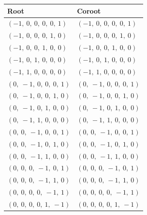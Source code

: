 \documentclass[11pt]{article}
\theoremstyle{definition}
\begin{document}
\begin{tabular}{|l|l|}
    \hline
    \textbf{Root} & \textbf{Coroot} \\
    \hline
    $\left( -1, \  0, \  0, \  0, \  0, \  1\right)$ & $\left( -1, \  0, \  0, \  0, \  0, \  1\right)$ \\
    \hline
    $\left( -1, \  0, \  0, \  0, \  1, \  0\right)$ & $\left( -1, \  0, \  0, \  0, \  1, \  0\right)$ \\
    \hline
    $\left( -1, \  0, \  0, \  1, \  0, \  0\right)$ & $\left( -1, \  0, \  0, \  1, \  0, \  0\right)$ \\
    \hline
    $\left( -1, \  0, \  1, \  0, \  0, \  0\right)$ & $\left( -1, \  0, \  1, \  0, \  0, \  0\right)$ \\
    \hline
    $\left( -1, \  1, \  0, \  0, \  0, \  0\right)$ & $\left( -1, \  1, \  0, \  0, \  0, \  0\right)$ \\
    \hline
    $\left( 0, \  -1, \  0, \  0, \  0, \  1\right)$ & $\left( 0, \  -1, \  0, \  0, \  0, \  1\right)$ \\
    \hline
    $\left( 0, \  -1, \  0, \  0, \  1, \  0\right)$ & $\left( 0, \  -1, \  0, \  0, \  1, \  0\right)$ \\
    \hline
    $\left( 0, \  -1, \  0, \  1, \  0, \  0\right)$ & $\left( 0, \  -1, \  0, \  1, \  0, \  0\right)$ \\
    \hline
    $\left( 0, \  -1, \  1, \  0, \  0, \  0\right)$ & $\left( 0, \  -1, \  1, \  0, \  0, \  0\right)$ \\
    \hline
    $\left( 0, \  0, \  -1, \  0, \  0, \  1\right)$ & $\left( 0, \  0, \  -1, \  0, \  0, \  1\right)$ \\
    \hline
    $\left( 0, \  0, \  -1, \  0, \  1, \  0\right)$ & $\left( 0, \  0, \  -1, \  0, \  1, \  0\right)$ \\
    \hline
    $\left( 0, \  0, \  -1, \  1, \  0, \  0\right)$ & $\left( 0, \  0, \  -1, \  1, \  0, \  0\right)$ \\
    \hline
    $\left( 0, \  0, \  0, \  -1, \  0, \  1\right)$ & $\left( 0, \  0, \  0, \  -1, \  0, \  1\right)$ \\
    \hline
    $\left( 0, \  0, \  0, \  -1, \  1, \  0\right)$ & $\left( 0, \  0, \  0, \  -1, \  1, \  0\right)$ \\
    \hline
    $\left( 0, \  0, \  0, \  0, \  -1, \  1\right)$ & $\left( 0, \  0, \  0, \  0, \  -1, \  1\right)$ \\
    \hline
    $\left( 0, \  0, \  0, \  0, \  1, \  -1\right)$ & $\left( 0, \  0, \  0, \  0, \  1, \  -1\right)$ \\

\end{tabular}
\end{document}
